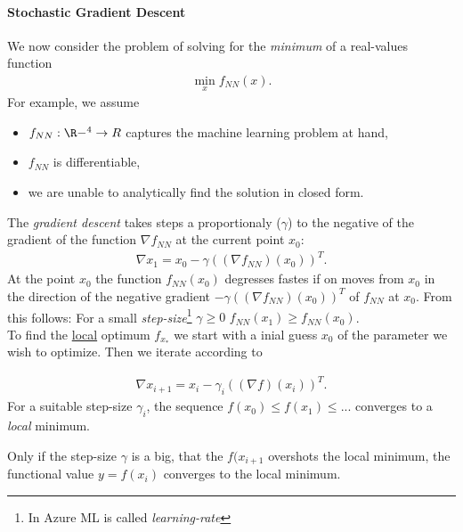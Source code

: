 \paragraph{Stochastic Gradient Descent}
We now consider the problem of solving for the \textit{minimum} of a real-values function
\begin{align}
	\min_{x} 	f_{NN}(x).
\end{align}
For example, we assume
\begin{itemize}
	\item $	f_{NN}:\R-^4 \rightarrow R$ captures the machine learning problem at hand,
	\item $f_{NN}$ is differentiable,
	\item we are unable to analytically find the solution in closed form.
\end{itemize}
The \textit{gradient descent} takes steps a proportionaly ($\gamma$) to the negative of the gradient of the function $\nabla 	f_{NN}$ at the current point $x_0$:
\begin{align}
	\nabla x_1 = x_0 - \gamma ((\nabla 	f_{NN})(x_0))^T.
\end{align}
At the point $x_0$ the function $	f_{NN}(x_0)$ degresses fastes if on moves from $x_0$ in the direction of the negative gradient $- \gamma ((\nabla 	f_{NN})(x_0))^T$ of $f_{NN}$ at $x_0$. From this follows: For a small \textit{step-size}\footnote{In Azure ML is called \textit{learning-rate}} $\gamma \geq 0$ $	f_{NN}(x_1)\geq 	f_{NN}(x_0)$.\\


To find the \underline{local} optimum $f_{x_*}$ we start with a inial guess $x_0$ of the parameter we wish to optimize. Then we iterate according to 

\begin{align}
	\nabla x_{i+1} = x_i - \gamma_i ((\nabla f)(x_i))^T.
\end{align}
For a suitable step-size $\gamma_i$, the sequence $f(x_0)\leq f(x_1) \leq ... $ converges to a \textit{local} minimum.

Only if the step-size $\gamma$ is a big, that the $f(x_{i+1}$ overshots the local minimum, the functional value $y=f(x_{i})$ converges to the local minimum.

